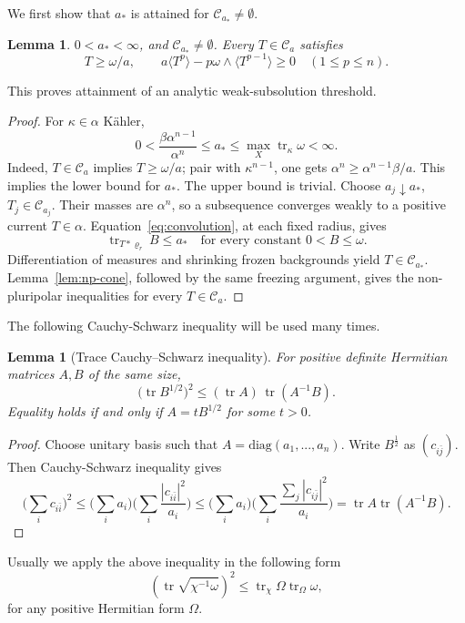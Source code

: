 \documentclass[reqno]{amsart}
\numberwithin{equation}{section}
\newtheorem{lemma}[theorem]{Lemma}
\theoremstyle{definition}
\DeclareMathOperator{\tr}{tr}
\newcommand{\cC}{\mathcal C}
\begin{document}
We first show that $a_*$ is attained for $\cC_{a_*}\neq \emptyset$.
\begin{lemma}\label{lem:attainment}
 $0<a_*<\infty$, and $\mathcal C_{a_*}\ne\emptyset$. Every $T\in\mathcal C_a$ satisfies
\begin{equation}\label{eq:weak-subsolution}
T\geq\omega/a,\qquad
a\langle T^p\rangle-p\omega\wedge\langle T^{p-1}\rangle\geq0
\quad(1\leq p\leq n).
\end{equation}
\end{lemma}
This proves attainment of an analytic weak-subsolution threshold.
\begin{proof}
For $\kappa\in\alpha$ K\"ahler,
\[
 0<\frac{\beta\alpha^{n-1}}{\alpha^n}\le a_*
 \le\max_X\tr_\kappa\omega<\infty.
\]
Indeed, $T\in\mathcal C_a$ implies $T\ge\omega/a$; pair with $\kappa^{n-1}$, one gets $\alpha^n\geq \alpha^{n-1}\beta/a$. This implies the lower bound for $a_*$. The upper bound is trivial.  Choose $a_j\downarrow a_*$, $T_j\in\mathcal C_{a_j}$. Their masses are $\alpha^n$, so a subsequence converges weakly to a positive current $T\in\alpha$. Equation~\eqref{eq:convolution}, at each fixed radius, gives
\[
 \tr_{T*\varrho_r}B\le a_*
 \quad\text{for every constant }0<B\le\omega.
\]
Differentiation of measures and shrinking frozen backgrounds yield $T\in\mathcal C_{a_*}$. Lemma~\ref{lem:np-cone}, followed by the same freezing argument, gives the non-pluripolar inequalities for every $T\in\mathcal C_a$.
\end{proof}

The following Cauchy-Schwarz inequality will be used many times. 
\begin{lemma}[Trace Cauchy--Schwarz inequality]\label{lem:trace-cs}
For positive definite Hermitian matrices $A,B$ of the same size,
\begin{equation}\label{eq:trace-cs}
\bigl(\tr B^{1/2}\bigr)^2
\le (\tr A)\,\tr(A^{-1}B).
\end{equation}
Equality holds if and only if $A=tB^{1/2}$ for some $t>0$.
\end{lemma}
\begin{proof}
Choose unitary basis such that $A=\text{diag}(a_1,...,a_n)$. Write $B^\frac{1}{2}$ as $(c_{i\bar j})$. Then Cauchy-Schwarz inequality gives \[
\bigl(\sum_ic_{i\bar i}\bigl)^2\leq \bigl(\sum_ia_i\bigl)\bigl(\sum_i\frac{|c_{i\bar i}|^2}{a_i}\big)\leq \bigl(\sum_ia_i\bigl)\bigl(\sum_i\frac{\sum_j|c_{i\bar j}|^2}{a_i}\big)=\tr A\tr(A^{-1}B).
\]
\end{proof}
Usually we apply the above inequality in the following form\[
(\tr\sqrt{\chi^{-1}\omega})^2\leq \tr_{\chi}\Omega\tr_{\Omega}\omega,
\] for any positive Hermitian form $\Omega$. 
\end{document}

